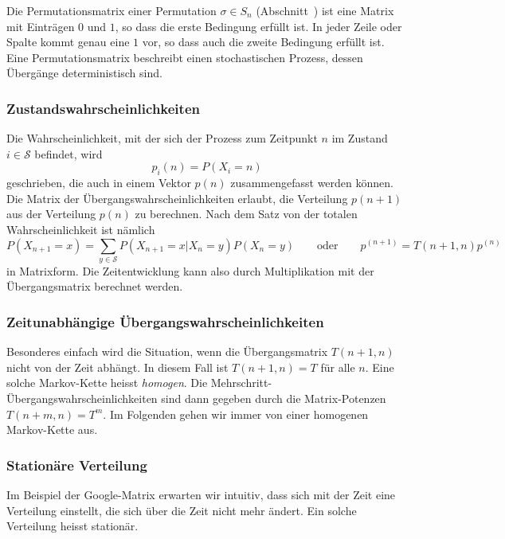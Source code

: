 \begin{beispiel}
Die Permutationsmatrix einer Permutation $\sigma\in S_n$ 
(Abschnitt~\label{buch:section:permutationsmatrizen})
ist eine Matrix mit Einträgen $0$ und $1$, so dass die erste Bedingung
erfüllt ist.
In jeder Zeile oder Spalte kommt genau eine $1$ vor, so dass auch die
zweite Bedingung erfüllt ist.
Eine Permutationsmatrix beschreibt einen stochastischen Prozess, dessen
Übergänge deterministisch sind.
\end{beispiel}

\subsubsection{Zustandswahrscheinlichkeiten}
Die Wahrscheinlichkeit, mit der sich der Prozess zum Zeitpunkt $n$
im Zustand $i\in\mathcal{S}$ befindet, wird
\[
p_i(n)
=
P(X_i=n)
\]
geschrieben, die auch in einem Vektor $p(n)$ zusammengefasst
werden können.
Die Matrix der Übergangswahrscheinlichkeiten erlaubt, die Verteilung
$p(n+1)$ aus der Verteilung $p(n)$ zu berechnen.
Nach dem Satz von der totalen Wahrscheinlichkeit ist nämlich
\[
P(X_{n+1}=x)
=
\sum_{y\in\mathcal{S}} 
P(X_{n+1}=x|X_n=y) P(X_n=y)
\qquad\text{oder}\qquad
p^{(n+1)} = T(n+1,n) p^{(n)}
\]
in Matrixform.
Die Zeitentwicklung kann also durch Multiplikation mit der Übergangsmatrix
berechnet werden.

\subsubsection{Zeitunabhängige Übergangswahrscheinlichkeiten}
Besonderes einfach wird die Situation, wenn die Übergangsmatrix $T(n+1,n)$
nicht von der Zeit abhängt.
In diesem Fall ist $T(n+1,n) = T$ für alle $n$.
Eine solche Markov-Kette heisst {\em homogen}.
%
Die Mehrschritt-Übergangswahrscheinlichkeiten sind dann gegeben
durch die Matrix-Potenzen $T(n+m,n)=T^m$.
Im Folgenden gehen wir immer von einer homogenen Markov-Kette aus.

\subsubsection{Stationäre Verteilung}
Im Beispiel der Google-Matrix erwarten wir intuitiv, dass sich mit
der Zeit eine Verteilung einstellt,  die sich über die Zeit nicht
mehr ändert.
Ein solche Verteilung heisst stationär.

